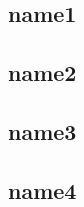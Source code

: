 \documentclass{whureport}
\def\namefst{name1}
\def\namesnd{name2}
\def\namethird{name3}
\def\namefourth{name4}
\begin{document}
\subsection{\namefst}



\subsection{\namesnd}



\subsection{\namethird}



\subsection{\namefourth}
\end{document}
